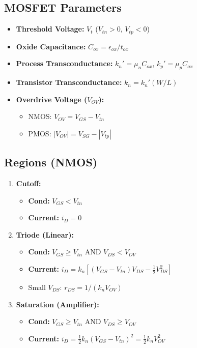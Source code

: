 \documentclass[10pt]{article}
\begin{document}
\begin{multicols*}{2}
\subsection*{MOSFET Parameters}
\begin{itemize}\itemsep0pt
    \item \textbf{Threshold Voltage:} $V_t$ ($V_{tn} > 0$, $V_{tp} < 0$)
    \item \textbf{Oxide Capacitance:} $C_{ox} = \epsilon_{ox} / t_{ox}$
    \item \textbf{Process Transconductance:} $k_n' = \mu_n C_{ox}$, $k_p' = \mu_p C_{ox}$
    \item \textbf{Transistor Transconductance:} $k_n = k_n'(W/L)$
    \item \textbf{Overdrive Voltage ($V_{OV}$):}
    \begin{itemize}\itemsep0pt
        \item NMOS: $V_{OV} = V_{GS} - V_{tn}$
        \item PMOS: $|V_{OV}| = V_{SG} - |V_{tp}|$
    \end{itemize}
\end{itemize}

\subsection*{Regions (NMOS)}
\begin{enumerate}\itemsep0pt
    \item \textbf{Cutoff:}
    \begin{itemize}\itemsep0pt
        \item \textbf{Cond:} $V_{GS} < V_{tn}$
        \item \textbf{Current:} $i_D = 0$
    \end{itemize}
    
    \item \textbf{Triode (Linear):}
    \begin{itemize}\itemsep0pt
        \item \textbf{Cond:} $V_{GS} \ge V_{tn}$ AND $V_{DS} < V_{OV}$
        \item \textbf{Current:} $i_D = k_n \left[ (V_{GS} - V_{tn})V_{DS} - \frac{1}{2}V_{DS}^2 \right]$
        \item Small $V_{DS}$: $r_{DS} = 1 / (k_n V_{OV})$
    \end{itemize}
    
    \item \textbf{Saturation (Amplifier):}
    \begin{itemize}\itemsep0pt
        \item \textbf{Cond:} $V_{GS} \ge V_{tn}$ AND $V_{DS} \ge V_{OV}$
        \item \textbf{Current:} $i_D = \frac{1}{2} k_n (V_{GS} - V_{tn})^2 = \frac{1}{2} k_n V_{OV}^2$
    \end{itemize}
\end{enumerate}


\end{multicols*}
\end{document}

